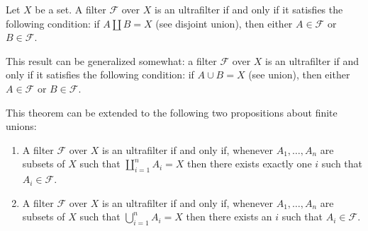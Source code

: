\documentclass[12pt]{article}
\def\F{\mathcal{F}}
\begin{document}

Let $X$ be a set.
A filter $\F$ over $X$ is an ultrafilter if and only if
it satisfies the following condition:
if $A \coprod B = X$ (see disjoint union),
then either $A \in \F$ or $B \in \F$.

This result can be generalized somewhat:
a filter $\F$ over $X$ is an ultrafilter if and only if
it satisfies the following condition:
if $A \cup B = X$ (see union), then either $A \in \F$ or $B \in \F$.

This theorem can be extended to
the following two propositions about finite unions:
\begin{enumerate}
\item A filter $\F$ over $X$ is an ultrafilter if and only if,
whenever $A_1,\dots,A_n$ are subsets of $X$ such that $\coprod_{i=1}^n A_i = X$
then there exists exactly one $i$ such that $A_i \in \F$.
\item A filter $\F$ over $X$ is an ultrafilter if and only if,
whenever $A_1,\dots,A_n$ are subsets of $X$ such that $\bigcup_{i=1}^n A_i = X$
then there exists an $i$ such that $A_i \in \F$.
\end{enumerate}
\end{document}
